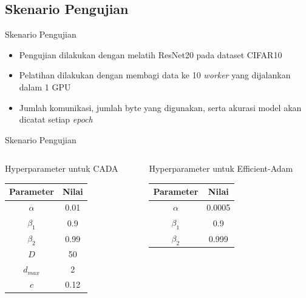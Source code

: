 \documentclass[aspectratio=169]{beamer}
\begin{document}
\subsection{Skenario Pengujian}
\begin{frame}{Skenario Pengujian}
  \begin{itemize}
    \item Pengujian dilakukan dengan melatih ResNet20 pada dataset CIFAR10
    \item Pelatihan dilakukan dengan membagi data ke 10 \textit{worker} yang dijalankan dalam 1 GPU
    \item Jumlah komunikasi, jumlah byte yang digunakan, serta akurasi model akan dicatat setiap \textit{epoch}
  \end{itemize}
\end{frame}
\begin{frame}{Skenario Pengujian}
  \begin{columns}[b]
    \begin{column}{3.5cm}
      Hyperparameter untuk CADA \\
      \begin{tabular}{ | c | c | }
        \hline
        \textbf{Parameter} & \textbf{Nilai} \\
        \hline
        $\alpha$           & 0.01           \\
        \hline
        $\beta_1$          & 0.9            \\
        \hline
        $\beta_2$          & 0.99           \\
        \hline
        $D$                & 50             \\
        \hline
        $d_{max}$          & 2              \\
        \hline
        $c$                & 0.12           \\
        \hline
      \end{tabular}
    \end{column}
    \begin{column}{3.5cm}
      Hyperparameter untuk Efficient-Adam \\
      \begin{tabular}{ | c | c | }
        \hline
        \textbf{Parameter} & \textbf{Nilai} \\
        \hline
        $\alpha$           & 0.0005         \\
        \hline
        $\beta_1$          & 0.9            \\
        \hline
        $\beta_2$          & 0.999          \\

\end{tabular}
\end{column}
\end{columns}
\end{frame}
\end{document}
